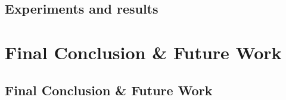 \documentclass[letter,12pt,TexShade,oneside]{book}
\begin{document}
\chapter{Experiments and results}
\label{part:main body}
\part{Final Conclusion \& Future Work}
\chapter{Final Conclusion \& Future Work}
\label{part:conclusion}

\begin{onehalfspacing}

\end{onehalfspacing}


\newpage

%
%







\begin{onehalfspacing}

\end{onehalfspacing}

\normalsize
\printindex

%
%



% 
\end{document}
